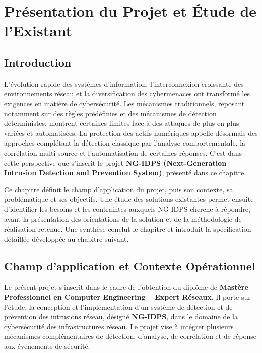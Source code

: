 
\chapter{Présentation du Projet et Étude de l'Existant}
\label{chap:chap1}

\minitoc
\newpage

\section{Introduction}

L'évolution rapide des systèmes d'information, l'interconnexion croissante des environnements réseau et la diversification des cybermenaces ont transformé les exigences en matière de cybersécurité. Les mécanismes traditionnels, reposant notamment sur des règles prédéfinies et des mécanismes de détection déterministes, montrent certaines limites face à des attaques de plus en plus variées et automatisées. La protection des actifs numériques appelle désormais des approches complétant la détection classique par l'analyse comportementale, la corrélation multi-source et l'automatisation de certaines réponses. C'est dans cette perspective que s'inscrit le projet \textbf{NG-IDPS (Next-Generation Intrusion Detection and Prevention System)}, présenté dans ce chapitre.

Ce chapitre définit le champ d'application du projet, puis son contexte, sa problématique et ses objectifs. Une étude des solutions existantes permet ensuite d'identifier les besoins et les contraintes auxquels NG-IDPS cherche à répondre, avant la présentation des orientations de la solution et de la méthodologie de réalisation retenue. Une synthèse conclut le chapitre et introduit la spécification détaillée développée au chapitre suivant.


\section{Champ d'application et Contexte Opérationnel}
Le présent projet s'inscrit dans le cadre de l'obtention     du diplôme de \textbf{Mastère Professionnel en Computer Engineering -- Expert Réseaux}. Il porte sur l'étude, la conception et l'implémentation d'un système de détection et de prévention des intrusions réseau, désigné \textbf{NG-IDPS}, dans le domaine de la cybersécurité des infrastructures réseau. Le projet vise à intégrer plusieurs mécanismes complémentaires de détection, d'analyse, de corrélation et de réponse aux événements de sécurité.

